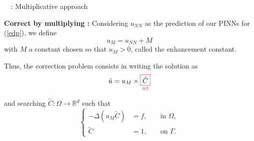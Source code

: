 \begin{frame}{\appendixname~\theappendixframenumber~: Multiplicative approach}
	\vspace{-5pt}
	
	\textbf{Correct by multiplying :} Considering $u_{NN}$ as the prediction of our PINNs for (\ref{edp}), we define
	\begin{equation*}
		u_M = u_{NN}+M
	\end{equation*}
	with $M$ a constant chosen so that $u_M>0$, called the enhancement constant.
	
	Thus, the correction problem consists in writing the solution as
	\begin{equation*}
		\tilde{u}=u_M\times\underset{\textcolor{red}{\approx 1}}{\fcolorbox{red}{white}{$\tilde{C}$}}
	\end{equation*}
	
	\begin{minipage}{\linewidth}
		and searching $\tilde{C}: \Omega \rightarrow \mathbb{R}^d$ such that
		\begin{equation*}
			\left\{\begin{aligned}
				-\Delta(u_M\tilde{C})&=f, \; &&\text{in } \Omega, \\
				\tilde{C}&=1, \; &&\text{on } \Gamma.
			\end{aligned}\right. \label{corr_add}
		\end{equation*}
	\end{minipage}
\end{frame}
\addtocounter{appendixframenumber}{1}

%

%
